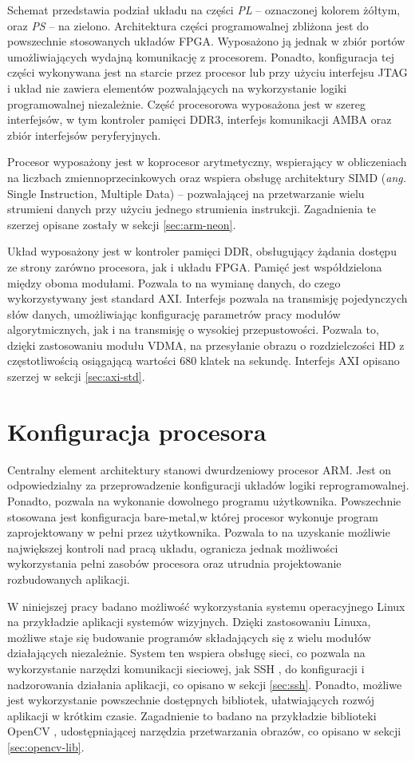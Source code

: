 Schemat przedstawia podział układu na części \emph{PL} -- oznaczonej kolorem żółtym, oraz \emph{PS} -- na zielono.
Architektura części programowalnej zbliżona jest do powszechnie stosowanych układów FPGA. Wyposażono ją jednak w zbiór portów umożliwiających wydajną komunikację z procesorem. Ponadto, konfiguracja tej części wykonywana jest na starcie przez procesor lub przy użyciu interfejsu JTAG i układ nie zawiera elementów pozwalających na wykorzystanie logiki programowalnej niezależnie.
Część procesorowa wyposażona jest w szereg interfejsów, w tym kontroler pamięci DDR3, interfejs komunikacji AMBA oraz zbiór interfejsów peryferyjnych.

Procesor wyposażony jest w koprocesor arytmetyczny, wspierający w obliczeniach na liczbach zmiennoprzecinkowych oraz wspiera obsługę architektury SIMD (\emph{ang.} Single Instruction, Multiple Data) -- pozwalającej na przetwarzanie wielu strumieni danych przy użyciu jednego strumienia instrukcji. Zagadnienia te szerzej opisane zostały w sekcji \ref{sec:arm-neon}.

Układ wyposażony jest w kontroler pamięci DDR, obsługujący żądania dostępu ze strony zarówno procesora, jak i układu FPGA. Pamięć jest współdzielona między oboma modułami. Pozwala to na wymianę danych, do czego wykorzystywany jest standard AXI. Interfejs pozwala na transmisję pojedynczych słów danych, umożliwiając konfigurację parametrów pracy modułów algorytmicznych, jak i na transmisję o wysokiej przepustowości. Pozwala to, dzięki zastosowaniu modułu VDMA, na przesyłanie obrazu o rozdzielczości HD z częstotliwością osiągającą wartości 680 klatek na sekundę. \cite{axi-vdma-guide} Interfejs AXI opisano szerzej w sekcji \ref{sec:axi-std}.

\section{Konfiguracja procesora}
\label{sec:arm-programming}
Centralny element architektury stanowi dwurdzeniowy procesor ARM. Jest on odpowiedzialny za przeprowadzenie konfiguracji układów logiki reprogramowalnej. Ponadto, pozwala na wykonanie dowolnego programu użytkownika. Powszechnie stosowana jest konfiguracja bare-metal,w której procesor wykonuje program zaprojektowany w pełni przez użytkownika. Pozwala to na uzyskanie możliwie największej kontroli nad pracą układu, ogranicza jednak możliwości wykorzystania pełni zasobów procesora oraz utrudnia projektowanie rozbudowanych aplikacji.

W niniejszej pracy badano możliwość wykorzystania systemu operacyjnego Linux na przykładzie aplikacji systemów wizyjnych. Dzięki zastosowaniu Linuxa, możliwe staje się budowanie programów składających się z wielu modułów działających niezależnie. System ten wspiera obsługę sieci, co pozwala na wykorzystanie narzędzi komunikacji sieciowej, jak SSH \cite{ssh-protocol}, do konfiguracji i nadzorowania działania aplikacji, co opisano w sekcji \ref{sec:ssh}. Ponadto, możliwe jest wykorzystanie powszechnie dostępnych bibliotek, ułatwiających rozwój aplikacji w krótkim czasie. Zagadnienie to badano na przykładzie biblioteki OpenCV \cite{opencv-library}, udostępniającej narzędzia przetwarzania obrazów, co opisano w sekcji \ref{sec:opencv-lib}.

